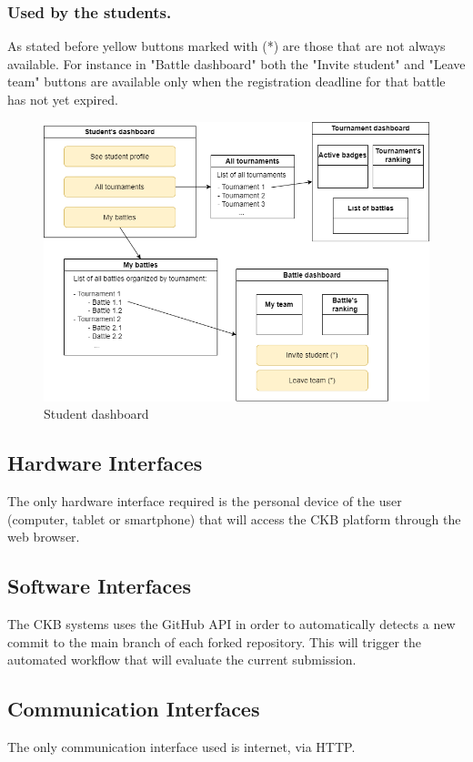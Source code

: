 \subsubsection{Used by the students.}
As stated before yellow buttons marked with (*) are those that are not always available. For instance in "Battle dashboard" both the "Invite student" and "Leave team" buttons are available only when the registration deadline for that battle has not yet expired.
\begin{figure}[H]
    \centering
    \includegraphics[scale=0.5]{images/student_dashboard.png}
    \caption{Student dashboard}
    \label{fig:stuDash}
\end{figure}

\subsection{Hardware Interfaces}
The only hardware interface required is the personal device of the user (computer, tablet or smartphone) that will access the CKB platform through the web browser.
\subsection{Software Interfaces}
The CKB systems uses the GitHub API in order to automatically detects a new commit to the main branch of each forked repository. This will trigger the automated workflow that will evaluate the current submission.
\subsection{Communication Interfaces}
The only communication interface used is internet, via HTTP.
\clearpage

